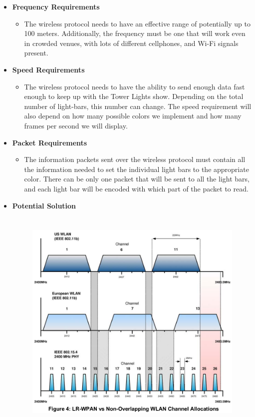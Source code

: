 \documentclass[12pt]{article}
\begin{document}
{{	%
	{\renewcommand\labelitemi{}
		\begin{itemize}
			\item \textbf{Frequency Requirements}
			\begin{itemize}
				\item The wireless protocol needs to have an effective range of potentially up to 100 meters. Additionally, the
				frequency must be one that will work even in crowded venues, with lots of different cellphones, and
				Wi-Fi signals present.
			\end{itemize}
			\item \textbf{Speed Requirements}
			\begin{itemize}
				\item The wireless protocol needs to have the ability to send enough data fast enough to keep up with the
				Tower Lights show. Depending on the total number of light-bars, this number can change. The speed
				requirement will also depend on how many possible colors we implement and how many frames per
				second we will display.
			\end{itemize}
			\item \textbf{Packet Requirements}
			\begin{itemize}
				\item The information packets sent over the wireless protocol must contain all the information needed to set
				the individual light bars to the appropriate color. There can be only one packet that will be sent to all
				the light bars, and each light bar will be encoded with which part of the packet to read.
			\end{itemize}
			\item \textbf{Potential Solution}
				\begin{figure}[!htb]
					\centering
					\includegraphics[height = 110mm]{assets/Zigbee.png}

\end{figure}
\end{itemize}}}}
\end{document}
